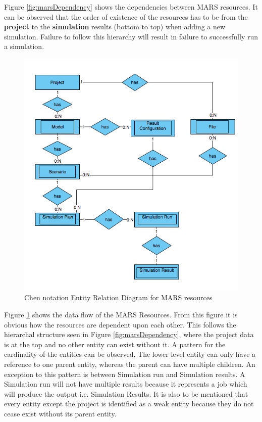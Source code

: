         Figure \ref{fig:marsDependency} shows the dependencies between MARS resources. It can be observed
        that the order of existence of the resources has to be from the \textbf{project} to the \textbf{simulation} results 
        (bottom to top) when adding a new simulation. Failure to follow this hierarchy will result in failure to
        successfully run a simulation.

        \begin{figure}[H]
            \centering \includegraphics[scale=0.6]{grafiken/ERMars.png}
            \caption{Chen notation Entity Relation Diagram for MARS resources}
            \label{fig:ERMars}
        \end{figure}
        
        Figure \ref{fig:ERMars} shows the data flow of the MARS Resources. From this figure it is obvious 
        how the resources are dependent upon each other. This follows the hierarchal structure seen in Figure \ref{fig:marsDependency},
        where the project data is at the top and no other entity can exist without it. A pattern for the cardinality of the entities can be observed.
        The lower level entity can only have a reference to one parent entity, whereas the parent can have multiple children. An exception to this
        pattern is between Simulation run and Simulation results. A Simulation run will not have multiple results because it represents a job which will produce
        the output i.e. Simulation Results. It is also to be mentioned that every entity except the project is identified as a weak entity because they do not cease
        exist without its parent entity. 

